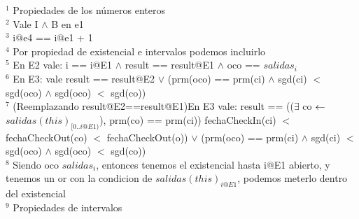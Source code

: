 \noindent $ ^1 $ Propiedades de los números enteros\\
$ ^2 $ Vale I $ \land $ B en e1\\
$ ^3 $ i@e4 == i@e1 + 1\\
$ ^4 $ Por propiedad de existencial e intervalos podemos incluirlo\\
$ ^5 $ En E2 vale: i == i@E1 $\land$ result == result@E1 $ \land $ oco == $salidas_i$\\
$ ^6 $ En E3: vale result == result@E2 $\lor$ (prm(oco) == prm(ci) $\land$ sgd(ci) $<$ sgd(oco) $\land$ sgd(oco) $<$ sgd(co))\\
$ ^7 $ (Reemplazando result@E2==result@E1)En E3 vale: result == (($ \exists $ co $ \leftarrow $ $salidas(this)_{[0..i@E1)}$), prm(co) == prm(ci)) fechaCheckIn(ci) $<$ fechaCheckOut(co) $<$ fechaCheckOut(o)) $ \lor $ (prm(oco) == prm(ci) $ \land $ sgd(ci) $<$ sgd(oco) $ \land $ sgd(oco) $<$ sgd(co)) \\
$ ^8 $ Siendo oco $salidas_i$, entonces tenemos el existencial hasta i@E1 abierto, y tenemos un or con la condicion de $ salidas(this)_{i@E1} $, podemos meterlo dentro del existencial\\
$ ^9 $ Propiedades de intervalos\\